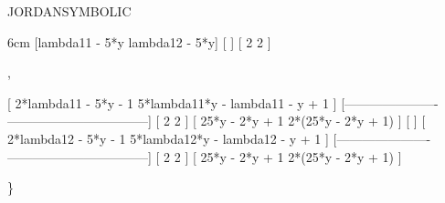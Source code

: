 \begin{Operator}[jordansymbolic]{JORDANSYMBOLIC}
\begin{Examples}
\begin{multilineoutput}{6cm}
 [lambda11 - 5*y  lambda12 - 5*y]
 [                              ]
 [      2               2       ]

 ,


 [ 2*lambda11 - 5*y - 1    5*lambda11*y - lambda11 - y + 1 ]
 [----------------------  ---------------------------------]
 [       2                              2                  ]
 [   25*y  - 2*y + 1             2*(25*y  - 2*y + 1)       ]
 [                                                         ]
 [ 2*lambda12 - 5*y - 1    5*lambda12*y - lambda12 - y + 1 ]
 [----------------------  ---------------------------------]
 [       2                              2                  ]
 [   25*y  - 2*y + 1             2*(25*y  - 2*y + 1)       ]

 \}

\end{multilineoutput}\\
\end{Examples}
\end{Operator}



